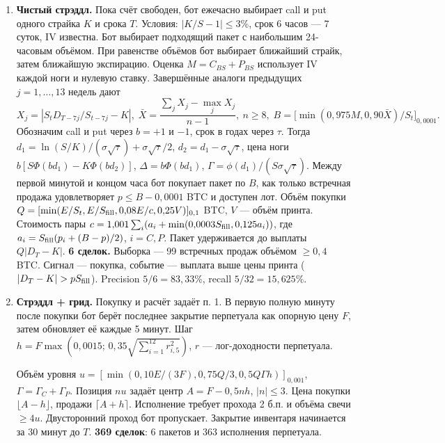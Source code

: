 \begin{enumerate}
\setlength{\itemsep}{2pt}\setlength{\parsep}{1pt}\setlength{\topsep}{2pt}
\item \textbf{Чистый стрэддл.} Пока счёт свободен, бот ежечасно выбирает call и put одного страйка $K$ и срока $T$. Условия: $|K/S-1|\le3\%$, срок 6 часов --- 7 суток, IV известна. Бот выбирает подходящий пакет с наибольшим 24-часовым объёмом. При равенстве объёмов бот выбирает ближайший страйк, затем ближайшую экспирацию. Оценка $M=C_{BS}+P_{BS}$ использует IV каждой ноги и нулевую ставку. Завершённые аналоги предыдущих $j=1,\dots,13$ недель дают
\[
 X_j=|S_t D_{T-7j}/S_{t-7j}-K|,\;
 \bar X=\frac{\sum_j X_j-\max_j X_j}{n-1},\ n\ge8,\;
 B=\big[\min(0{,}975M,0{,}90\bar X)/S_t\big]_{0{,}0001}.
\]
Обозначим call и put через $b=+1$ и $-1$, срок в годах через $\tau$. Тогда $d_1=\ln(S/K)/(\sigma\sqrt\tau)+\sigma\sqrt\tau/2$, $d_2=d_1-\sigma\sqrt\tau$, цена ноги $b[S\Phi(bd_1)-K\Phi(bd_2)]$, $\Delta=b\Phi(bd_1)$, $\Gamma=\phi(d_1)/(S\sigma\sqrt\tau)$. Между первой минутой и концом часа бот покупает пакет по $B$, как только встречная продажа удовлетворяет $p\le B-0{,}0001$ BTC и доступен лот.
Объём покупки $Q=[\min(E/S_t,E/S_{\rm fill},0{,}08E/c,0{,}25V)]_{0{,}1}$ BTC, $V$ --- объём принта. Стоимость пары $c=1{,}001\sum_i(a_i+\min(0{,}0003S_{\rm fill},0{,}125a_i))$, где $a_i=S_{\rm fill}(p_i+(B-p)/2)$, $i=C,P$. Пакет удерживается до выплаты $Q|D_T-K|$. \textbf{6 сделок.}
Выборка --- 99 встречных продаж объёмом $\ge0{,}4$ BTC. Сигнал --- покупка, событие --- выплата выше цены принта ($|D_T-K|>pS_{\rm fill}$). Precision $5/6=83{,}33\%$, recall $5/32=15{,}625\%$.
\item \textbf{Стрэддл + грид.} Покупку и расчёт задаёт п. 1. В первую полную минуту после покупки бот берёт последнее закрытие перпетуала как опорную цену $F$, затем обновляет её каждые 5 минут. Шаг $h=F\max(0{,}0015;\,0{,}35\sqrt{\sum_{i=1}^{12}r_{i,5}^2})$, $r$ --- лог-доходности перпетуала.
\par Объём уровня $u=[\min(0{,}10E/(3F),0{,}75Q/3,0{,}5Q\Gamma h)]_{0{,}001}$, $\Gamma=\Gamma_C+\Gamma_P$. Позиция $nu$ задаёт центр $A=F-0{,}5nh$, $|n|\le3$. Цена покупки $\lfloor A-h\rfloor$, продажи $\lceil A+h\rceil$. Исполнение требует прохода 2 б.п. и объёма свечи $\ge4u$. Двусторонний проход бот пропускает. Закрытие инвентаря начинается за 30 минут до $T$. \textbf{369 сделок}: 6 пакетов и 363 исполнения перпетуала.

\end{enumerate}
